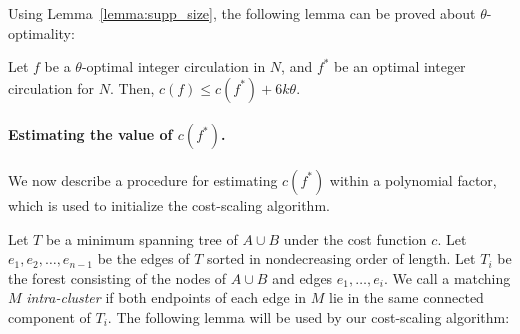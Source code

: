 \documentclass[11pt,twoside]{article}
\def\cost{c}
\theoremstyle{plain}
\numberwithin{figure}{section}
\renewcommand{\subparagraph}{\paragraph}
\def\EMPH#1{\textcolor{BrickRed}{{\emph{#1}}}}
\begin{document}
Using Lemma~\ref{lemma:supp_size}, the following lemma can be proved about
$\theta$-optimality:

\begin{lemma}
\label{lemma:goldberg_cost_add}
Let $f$ be a $\theta$-optimal integer circulation in $N$,
and $f^*$ be an optimal integer circulation for $N$.
Then, $\cost(f) \leq \cost(f^*) + 6k\theta$.
\end{lemma}

%
%

\subparagraph{Estimating the value of \EMPH{$\cost(f^*)$}.}
We now describe a procedure for estimating $\cost(f^*)$ within a polynomial factor,
which is used to initialize the cost-scaling algorithm.

Let \EMPH{$T$} be a minimum spanning tree of $A \cup B$ under the cost function $c$.
Let $e_1, e_2, \ldots, e_{n-1}$ be the edges of $T$ sorted in nondecreasing order
of length.
Let \EMPH{$T_i$} be the forest consisting of the nodes of $A \cup B$ and
edges $e_1, \ldots, e_i$.
We call a matching $M$ \EMPH{intra-cluster} if both endpoints of
each edge in $M$ lie in the same connected component of $T_i$.
%
The following lemma will be used by our cost-scaling algorithm:
\end{document}

